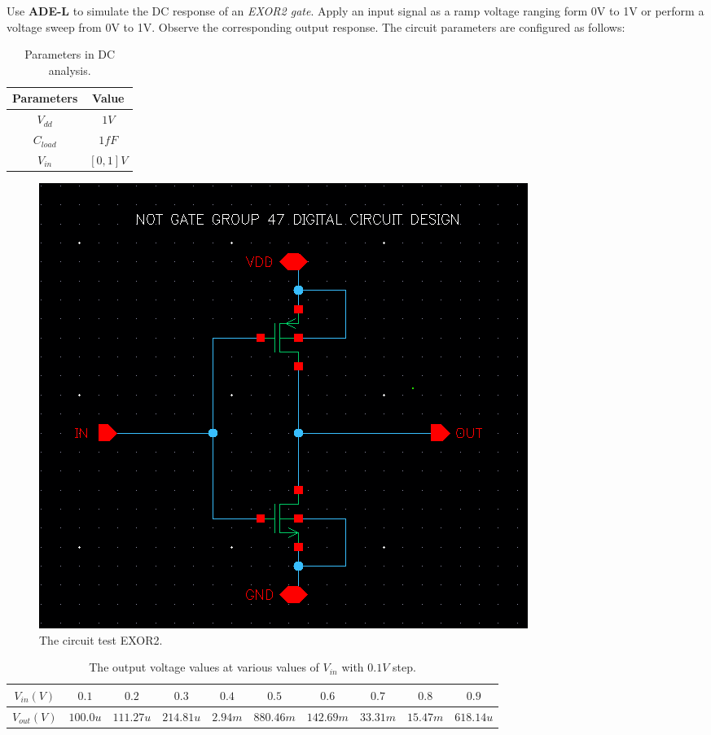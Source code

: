 Use \textbf{ADE-L} to simulate the DC response of an \textit{EXOR2 gate}. Apply an input signal as a ramp voltage ranging form 0V to 1V or perform a voltage sweep from 0V to 1V. Observe the corresponding output response. The circuit parameters are configured as follows:

\begin{table}[H]
	\centering
	\begin{tabular}{|c|c|}
		\hline
		Parameters & Value \\
		\hline
		$V_{dd}$ & $1V$ \\
		\hline
		$C_{load}$ & $1fF$\\
		\hline
		$V_{in}$ & $[0, 1] V$\\
		\hline
	\end{tabular}
	\caption{Parameters in DC analysis.}
\end{table}

\begin{figure}[H]
	\centering
	\includegraphics[width=.6\linewidth]{section/EX1/EXOR/EX1_EXOR2_DCanalysis_schematic.png}
	\caption{The circuit test EXOR2.}
\end{figure}


\begin{table}[H]
	\centering
	\begin{tabular}{|c|c|c|c|c|c|c|c|c|c|}
		\hline
		$V_{in}(V)$ & $0.1$ & $0.2$ & $0.3$ & $0.4$ & $0.5$ & $0.6$ & $0.7$ & $0.8$ & $0.9$ \\
		\hline
		$V_{out}(V)$ & $100.0u$ & $111.27u$ & $214.81u$ & $2.94m$ & $880.46m$ & $142.69m$ & $33.31m$ & $15.47m$ & $618.14u$ \\
		\hline
	\end{tabular}
	\caption{The output voltage values at various values of $V_{in}$ with $0.1V$ step.}
\end{table}

